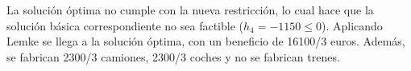 \begin{enumerate}
    La solución óptima no cumple con la nueva restricción, lo cual hace que la solución básica correspondiente no sea factible ($h_4 = -1150 \leq 0$). Aplicando Lemke se llega a la solución óptima, con un beneficio de 16100/3 euros. Además, se fabrican 2300/3 camiones, 2300/3 coches y no se fabrican trenes.
   
\end{enumerate}







